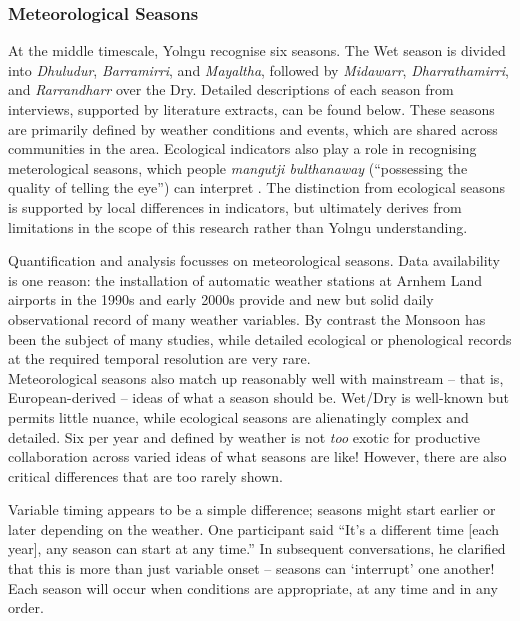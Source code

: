 \subsubsection{Meteorological Seasons}

At the middle timescale, Yolngu recognise six seasons.
The Wet season is divided into \textit{Dhuludur}, \textit{Barramirri},
and \textit{Mayaltha}, followed by \textit{Midawarr}, \textit{Dharrathamirri},
and \textit{Rarrandharr} over the Dry.  Detailed descriptions of each
season from interviews, supported by literature extracts, can be found below.
%
These seasons are primarily defined by weather conditions and events,
which are shared across communities in the area.  Ecological indicators
also play a role in recognising meterological seasons, which people
\textit{mangutji bulthanaway} (``possessing the quality of telling the eye'')
can interpret \citep[p35]{atlas2014}.  The distinction from ecological
seasons is supported by local differences in indicators, but ultimately
derives from limitations in the scope of this research rather than
Yolngu understanding.

Quantification and analysis focusses on meteorological seasons.
Data availability is one reason:  the installation of automatic weather
stations at Arnhem Land airports in the 1990s and early 2000s provide
and new but solid daily observational record of many weather variables.
By contrast the Monsoon has been the subject of many studies, while
detailed ecological or phenological records at the required temporal
resolution are very rare.\\


Meteorological seasons also match up reasonably well with mainstream --
that is, European-derived -- ideas of what a season should be.  Wet/Dry
is well-known but permits little nuance, while ecological seasons are
alienatingly complex and detailed.  Six per year and defined by weather
is not \emph{too} exotic for productive collaboration across varied
ideas of what seasons are like!  However, there are also critical
differences that are too rarely shown.

Variable timing appears to be a simple difference; seasons might start
earlier or later depending on the weather.  One participant said
``It's a different time [each year], any season can start at any time.''
In subsequent conversations, he clarified that this is more than just
variable onset -- seasons can `interrupt' one another!  Each season will
occur when conditions are appropriate, at any time and in any order.

